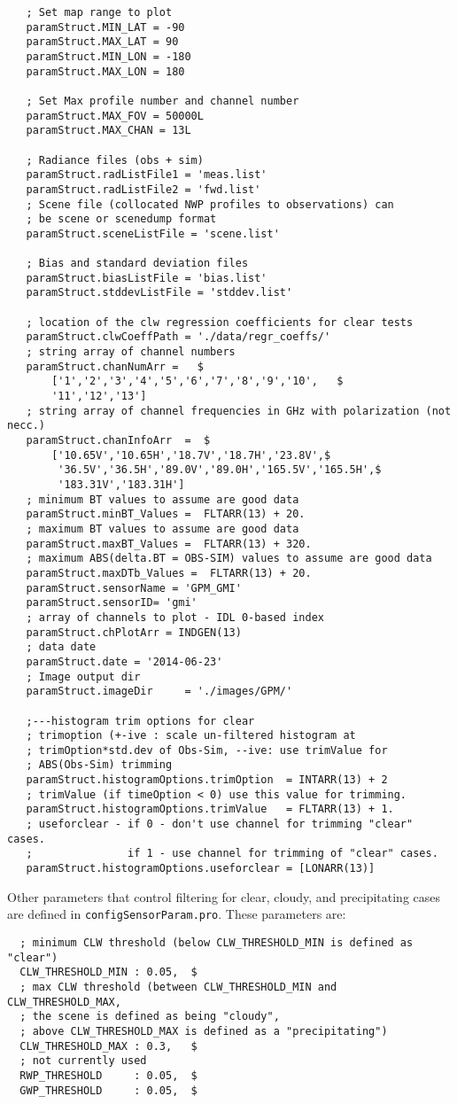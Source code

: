 \documentclass[10pt]{report}
\begin{document}
\begin{verbatim}
   ; Set map range to plot
   paramStruct.MIN_LAT = -90
   paramStruct.MAX_LAT = 90
   paramStruct.MIN_LON = -180
   paramStruct.MAX_LON = 180

   ; Set Max profile number and channel number
   paramStruct.MAX_FOV = 50000L
   paramStruct.MAX_CHAN = 13L 

   ; Radiance files (obs + sim)
   paramStruct.radListFile1 = 'meas.list'
   paramStruct.radListFile2 = 'fwd.list'
   ; Scene file (collocated NWP profiles to observations) can 
   ; be scene or scenedump format
   paramStruct.sceneListFile = 'scene.list'

   ; Bias and standard deviation files
   paramStruct.biasListFile = 'bias.list'
   paramStruct.stddevListFile = 'stddev.list'

   ; location of the clw regression coefficients for clear tests
   paramStruct.clwCoeffPath = './data/regr_coeffs/'
   ; string array of channel numbers
   paramStruct.chanNumArr =   $
       ['1','2','3','4','5','6','7','8','9','10',   $
       '11','12','13']
   ; string array of channel frequencies in GHz with polarization (not necc.)
   paramStruct.chanInfoArr  =  $
       ['10.65V','10.65H','18.7V','18.7H','23.8V',$
        '36.5V','36.5H','89.0V','89.0H','165.5V','165.5H',$
        '183.31V','183.31H']
   ; minimum BT values to assume are good data
   paramStruct.minBT_Values =  FLTARR(13) + 20.
   ; maximum BT values to assume are good data
   paramStruct.maxBT_Values =  FLTARR(13) + 320.
   ; maximum ABS(delta.BT = OBS-SIM) values to assume are good data
   paramStruct.maxDTb_Values =  FLTARR(13) + 20.
   paramStruct.sensorName = 'GPM_GMI'
   paramStruct.sensorID= 'gmi'
   ; array of channels to plot - IDL 0-based index 
   paramStruct.chPlotArr = INDGEN(13)
   ; data date
   paramStruct.date = '2014-06-23'
   ; Image output dir
   paramStruct.imageDir     = './images/GPM/'

   ;---histogram trim options for clear
   ; trimoption (+-ive : scale un-filtered histogram at 
   ; trimOption*std.dev of Obs-Sim, --ive: use trimValue for 
   ; ABS(Obs-Sim) trimming
   paramStruct.histogramOptions.trimOption  = INTARR(13) + 2
   ; trimValue (if timeOption < 0) use this value for trimming.
   paramStruct.histogramOptions.trimValue   = FLTARR(13) + 1.
   ; useforclear - if 0 - don't use channel for trimming "clear" cases.
   ;               if 1 - use channel for trimming of "clear" cases.
   paramStruct.histogramOptions.useforclear = [LONARR(13)]

\end{verbatim}
Other parameters that control filtering for clear, cloudy, and precipitating cases 
are defined in {\tt configSensorParam.pro}.  These parameters
are: 
\begin{verbatim}
  ; minimum CLW threshold (below CLW_THRESHOLD_MIN is defined as "clear")
  CLW_THRESHOLD_MIN : 0.05,  $
  ; max CLW threshold (between CLW_THRESHOLD_MIN and CLW_THRESHOLD_MAX, 
  ; the scene is defined as being "cloudy", 
  ; above CLW_THRESHOLD_MAX is defined as a "precipitating")
  CLW_THRESHOLD_MAX : 0.3,   $
  ; not currently used
  RWP_THRESHOLD     : 0.05,  $
  GWP_THRESHOLD     : 0.05,  $
\end{verbatim}
\end{document}
